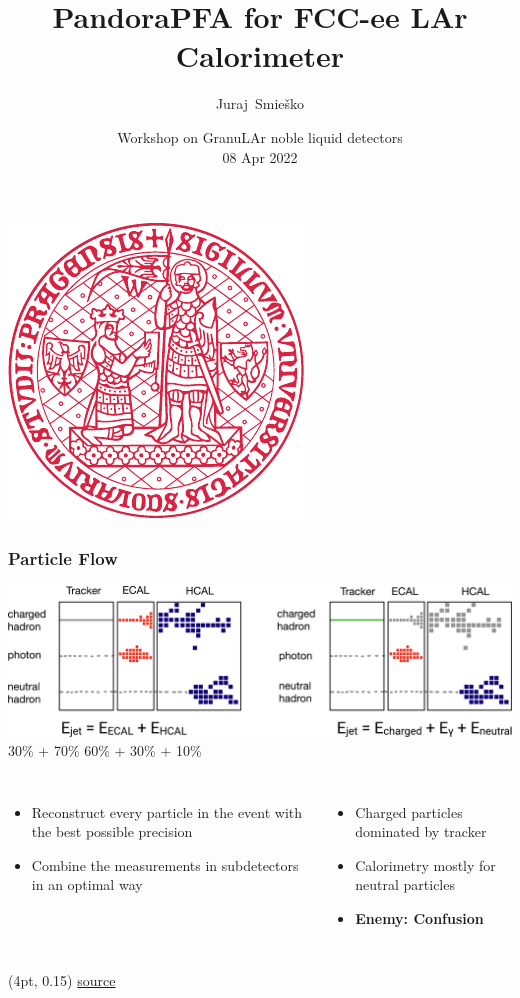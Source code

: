 \documentclass[aspectratio=169]{beamer}
\title{PandoraPFA for FCC-ee LAr Calorimeter}
\author{Juraj~Smie\v{s}ko\inst{1,2}}
\institute{\inst{1} Charles University, Czechia \\
           \inst{1} CERN}
\date{\footnotesize
      Workshop on GranuLAr noble liquid detectors \\
      08 Apr 2022}
\newcommand{\bluetext}[1]{%
  \textcolor{myBlue}{#1}
}
\begin{document}
{%
  \begin{frame}[noframenumbering]
    \centering
    \vspace{1cm}
    \includegraphics[width=.25\textwidth]{figures/CU_red_white_logo.pdf}
    \thispagestyle{empty}
  \end{frame}
}

\begin{frame}
  \titlepage{}
  \thispagestyle{empty}
\end{frame}

\begin{frame}
  \frametitle{\bf Particle Flow}

  \includegraphics[width=\linewidth]{figures/particle_flow_diagram.pdf}
  \vspace{-1.5ex}
  \hspace{6.7em} 30\% + 70\% \hspace{14.5em} 60\% + 30\% + 10\%

  \begin{columns}[c]
    \begin{itemize}
      \item Reconstruct every particle in the event with the best possible
            precision
      \item Combine the measurements in subdetectors in an optimal way
    \end{itemize}

    \begin{itemize}
      \item Charged particles dominated by tracker
      \item Calorimetry mostly for neutral particles
      \item \bluetext{\bf Enemy: Confusion}
    \end{itemize}
  \end{columns}

  \begin{textblock*}{\paperwidth}(4pt, 0.15\textheight)
    \tiny
    \href{https://indico.cern.ch/event/932973/}
         {source}
  \end{textblock*}
\end{frame}
\end{document}
